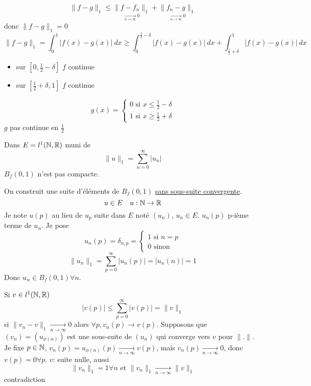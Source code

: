 \[
    \|f - g\|_1 \le \underset{\xrightarrow[n \to  \infty]{} 0}{\|f - f_n\|_1} + \underset{\xrightarrow[n \to  \infty]{} 0}{\|f_n - g\|_1}
\]
donc $\|f - g\|_1 = 0$
 \[
     \|f - g\|_1 = \int_{{0}}^{{1}} {|f(x) - g(x)|} \: d{x} \ge \int_{{0}}^{{\frac{1}{2} - \delta}} {|f(x) - g(x)|} \: d{x} + \int_{{\frac{1}{2} + \delta}}^{{1}} {|f(x) - g(x)|} \: d{x} 
\] 
\begin{itemize}
    \item sur $[0, \frac{1}{2} - \delta]$ $f$ continue
    \item sur $[\frac{1}{2} + \delta, 1]$ $f$ continue
\end{itemize}
\[
g(x) = \begin{cases}
    0 \text{ si } x \le \frac{1}{2} - \delta\\
    1 \text{ si } x \ge \frac{1}{2} + \delta
\end{cases}
\] 
$g$ pas continue en  $\frac{1}{2}$
 
\begin{lemma}
    Dans $E = l^{1}(\mathbb{N}, \mathbb{R})$ muni de
    \[
    \|u\|_1 = \sum_{n=0}^{\infty} |u_n|
    \] 
    $B_f(0, 1)$ n'est pas compacte.
\end{lemma}
\begin{preuve}
    On construit une suite d'éléments de $B_f(0, 1)$ \underline{sans sous-suite convergente}.
    \[
    u \in E \quad u: \mathbb{N} \to \mathbb{R}
    \] 
    Je note $u(p)$ au lieu de  $u_p$ suite dans  $E$ noté  $(u_n)$,  $u_n \in E$. $u_n(p)$ p-ième terme de  $u_n$. Je pose  
    \[
    u_n(p) = \delta_{n, p} = \begin{cases}
        1 \text{ si } n = p\\
        0 \text{ sinon}
    \end{cases}
    \] 
    \[
    \|u_n\|_1 = \sum_{p=0}^{\infty} |u_n(p)| = |u_n(n)| = 1
    \] 
    Donc $u_n \in B_f(0, 1) \forall n$.
    \par
    Si $v \in l^1(\mathbb{N}, \mathbb{R})$
    \[
    |v(p)| \le \sum_{p=0}^{\infty} |v(p)| = \|v\|_1
    \] 
    si $\|v_n - v\|_1 \xrightarrow[n \to \infty]{} 0$ alors $\forall p, v_n(p) \to v(p)$. Supposons que $(v_n) = (u_{\phi(n)})$ est une sous-suite de $(u_n)$ qui converge vers  $v$ pour  $\| . \|$. Je fixe $p \in \mathbb{N}$, $v_n(p) = u_{\phi(n)}(p) \xrightarrow[n \to \infty]{} v(p)$, mais $v_n(p) \xrightarrow[n \to \infty]{} 0$, donc $v(p) = 0 \forall p$. $v$: suite nulle, aussi 
     \[
    \|v_n\|_1 = 1 \forall n \text{ et } \|v_n\|_1 \xrightarrow[n \to \infty]{} \|v\|_1
    \] 
    contradiction
\end{preuve}
